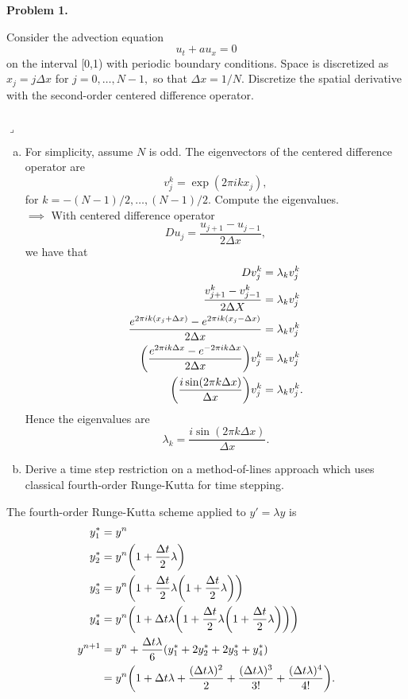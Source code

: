 \documentclass[12pt]{article}
\newenvironment{myprob}[1]
    {%
    \noindent{\Huge$\ulcorner$}\textbf{#1.}\begin{em}
    }
    { 
    \end{em} \\ \hphantom{l} \hfill {\Huge$\lrcorner$} }
\begin{document}
\rhead{\today}

{\let\newpage\relax} 


\begin{myprob}{Problem 1}
Consider the advection equation
$$u_t + au_x = 0 $$
on the interval [0,1) with periodic boundary conditions. Space is discretized as $x_j = j \Delta x$ for $j=0, \dots, N-1,$ so that $\Delta x = 1/N$.  Discretize the spatial derivative with the second-order centered difference operator.
\end{myprob}
\begin{enumerate}[(a)]
\item For simplicity, assume $N$ is odd.  The eigenvectors of the centered difference operator are 
$$v_j^k = \exp(2\pi i k x_j),$$
for $k=-(N-1)/2, \dots, (N-1)/2$.  Compute the eigenvalues. \\

$\implies$ With centered difference operator
  $$D u_j = \dfrac{u_{j+1} - u_{j-1}}{2\Delta x},$$
  we have that 
  \begin{align*}
  D v_j^k &= \lambda_k v_j^k \\
  \dfrac{v^k_{j+1}- v^k_{j-1}}{2\Delta X} &= \lambda_k v_j^k\\
  \dfrac{e^{2\pi i k (x_j+\Delta x)}- e^{2 \pi i k (x_j - \Delta x)}}{2\Delta x} &= \lambda_k v_j^k \\
 \qty( \dfrac{e^{2\pi i k \Delta x}- e^{-2 \pi i k \Delta x}}{2\Delta x }) v_j^k &= \lambda_k v_j^k \\
 \qty(\dfrac{i \sin(2\pi k \Delta x)}{\Delta x})v_j^k &= \lambda_k v_j^k.
  \end{align*}
 Hence the eigenvalues are $$\lambda_k = \dfrac{i \sin(2 \pi k \Delta x)}{\Delta x}.$$

\item Derive a time step restriction on a method-of-lines approach which uses classical fourth-order Runge-Kutta for time stepping.
\end{enumerate}
The fourth-order Runge-Kutta scheme applied to $y' = \lambda y$ is
\begin{align*}
y_1^* &= y^n \\
y_2^* &= y^n\qty(1 + \dfrac{\Delta t}{2} \lambda) \\
y_3^* &= y^n\qty(1 + \dfrac{\Delta t}{2} \lambda\qty(1 + \dfrac{\Delta t}{2} \lambda)) \\
y_4^* &= y^n\qty(1 + \Delta t \lambda\qty(1 + \dfrac{\Delta t}{2} \lambda\qty(1 + \dfrac{\Delta t}{2} \lambda))) \\
y^{n+1} &= y^n + \dfrac{\Delta t \lambda}{6}\qty(y_1^* + 2y_2^* +2y_3^*+y_4^*)\\
&= y^n\qty(1 + \Delta t \lambda + \dfrac{(\Delta t\lambda)^2}{2}+\dfrac{(\Delta t\lambda)^3}{3!}+\dfrac{(\Delta t\lambda)^4}{4!}).
\end{align*}
\end{document}
